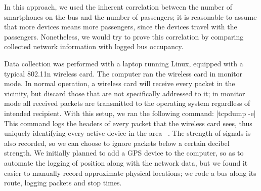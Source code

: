 In this approach, we used the inherent correlation between the number of smartphones on the bus and the number of passengers; it is reasonable to assume that more devices means more passengers, since the devices travel with the passengers.
Nonetheless, we would try to prove this correlation by comparing collected network information with logged bus occupancy.

Data collection was performed with a laptop running Linux, equipped with a typical 802.11n wireless card.
The computer ran the wireless card in monitor mode.
In normal operation, a wireless card will receive every packet in the vicinity, but discard those that are not specifically addressed to it; in monitor mode all received packets are transmitted to the operating system regardless of intended recipient. With this setup, we ran the following command:
|tcpdump -e|
This command logs the headers of every packet that the wireless card sees, thus uniquely identifying every active device in the area ~\cite{tcpdump}.
The strength of signals is also recorded, so we can choose to ignore packets below a certain decibel strength.
We initially planned to add a GPS device to the computer, so as to automate the logging of position along with the network data, but we found it easier to manually record approximate physical locations; we rode a bus along its route, logging packets and stop times.
